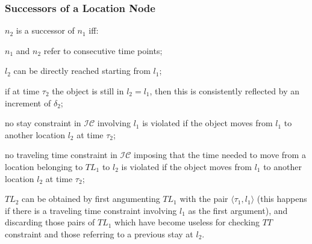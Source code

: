 
\begin{frame}
\frametitle{Successors of a Location Node}

$n_2$ is a successor of $n_1$ iff:

\begin{fitemize}
  \item $n_1$ and $n_2$ refer to consecutive time points;
  \item $l_2$ can be directly reached starting from $l_1$;
  \item if at time $\tau_2$ the object is still in $l_2 = l_1$, then this is consistently reflected by an increment of $\delta_2$;
  \item no stay constraint in $\mathcal{IC}$ involving $l_1$ is violated if the object moves from $l_1$ to another location $l_2$ at time $\tau_2$;
  \item no traveling time constraint in $\mathcal{IC}$ imposing that the time needed to move from a location belonging to $TL_1$ to $l_2$ is violated if the object moves from $l_1$ to another location $l_2$ at time $\tau_2$;
  \item $TL_2$ can be obtained by first angumenting $TL_1$ with the pair $\langle \tau_1, l_1 \rangle$ (this happens if there is a traveling time constraint involving $l_1$ as the first argument), and discarding those pairs of $TL_1$ which have become useless for checking $TT$ constraint and those referring to a previous stay at $l_2$.
\end{fitemize}

\end{frame}


